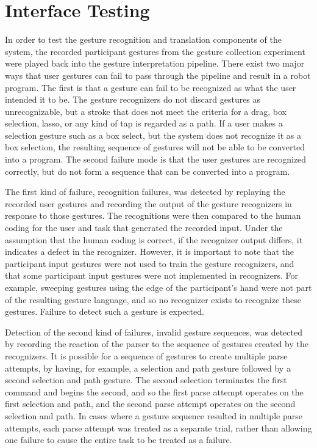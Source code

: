 \section{Interface Testing}

In order to test the gesture recognition and translation components of the system, the recorded participant gestures from the gesture collection experiment were played back into the gesture interpretation pipeline. 
There exist two major ways that user gestures can fail to pass through the pipeline and result in a robot program. 
The first is that a gesture can fail to be recognized as what the user intended it to be. 
The gesture recognizers do not discard gestures as unrecognizable, but a stroke that does not meet the criteria for a drag, box selection, lasso, or any kind of tap is regarded as a path. 
If a user makes a selection gesture such as a box select, but the system does not recognize it as a box selection, the resulting sequence of gestures will not be able to be converted into a program. 
The second failure mode is that the user gestures are recognized correctly, but do not form a sequence that can be converted into a program. 

The first kind of failure, recognition failures, was detected by replaying the recorded user gestures and recording the output of the gesture recognizers in response to those gestures. 
The recognitions were then compared to the human coding for the user and task that generated the recorded input. 
Under the assumption that the human coding is correct, if the recognizer output differs, it indicates a defect in the recognizer. 
However, it is important to note that the participant input gestures were not used to train the gesture recognizers, and that some participant input gestures were not implemented in recognizers. 
For example, sweeping gestures using the edge of the participant's hand were not part of the resulting gesture language, and so no recognizer exists to recognize these gestures. 
Failure to detect such a gesture is expected. 

Detection of the second kind of failures, invalid gesture sequences, was detected by recording the reaction of the parser to the sequence of gestures created by the recognizers. 
It is possible for a sequence of gestures to create multiple parse attempts, by having, for example, a selection and path gesture followed by a second selection and path gesture.
The second selection terminates the first command and begins the second, and so the first parse attempt operates on the first selection and path, and the second parse attempt operates on the second selection and path. 
In cases where a gesture sequence resulted in multiple parse attempts, each parse attempt was treated as a separate trial, rather than allowing one failure to cause the entire task to be treated as a failure.  

